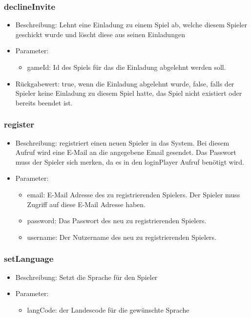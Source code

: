 \documentclass[a4paper]{scrreprt}
\begin{document}
	\subsubsection{declineInvite}
	\begin{itemize}
		\item Beschreibung: Lehnt eine Einladung zu einem Spiel ab, welche diesem Spieler geschickt wurde und löscht diese aus seinen Einladungen
		\item Parameter:
		\begin{itemize}
			\item gameId: Id des Spiels für das die Einladung abgelehnt werden soll.
		\end{itemize}
		\item Rückgabewert: true, wenn die Einladung abgelehnt wurde, false, falls der Spieler keine Einladung zu diesem Spiel hatte, das Spiel nicht existiert oder bereits beendet ist.
	\end{itemize}

	
    \subsubsection{register}
    \begin{itemize}
        \item Beschreibung: registriert einen neuen Spieler in das System. Bei diesem Aufruf wird eine E-Mail an die angegebene Email gesendet. Das Passwort muss der Spieler sich merken, da es in den loginPlayer Aufruf benötigt wird.
        \item Parameter:
        \begin{itemize}
            \item email: E-Mail Adresse des zu registrierenden Spielers. Der Spieler muss Zugriff auf diese E-Mail Adresse haben.
            \item password: Das Passwort des neu zu registrierenden Spielers.
            \item username: Der Nutzername des neu zu registrierenden Spielers.
        \end{itemize}
    \end{itemize}
    

	\subsubsection{setLanguage}
	\begin{itemize}
		\item Beschreibung: Setzt die Sprache für den Spieler
		\item Parameter:
		\begin{itemize}
			\item langCode: der Landescode für die gewünschte Sprache
		\end{itemize}
	\end{itemize}
\end{document}

